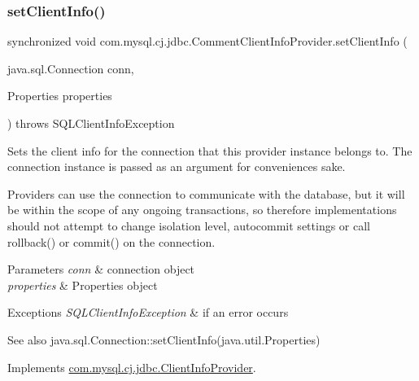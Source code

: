 \subsubsection{\texorpdfstring{set\+Client\+Info()}{setClientInfo()}\hspace{0.1cm}{\footnotesize\ttfamily [1/2]}}
{\footnotesize\ttfamily synchronized void com.\+mysql.\+cj.\+jdbc.\+Comment\+Client\+Info\+Provider.\+set\+Client\+Info (\begin{DoxyParamCaption}\item[{java.\+sql.\+Connection}]{conn,  }\item[{Properties}]{properties }\end{DoxyParamCaption}) throws S\+Q\+L\+Client\+Info\+Exception}

Sets the client info for the connection that this provider instance belongs to. The connection instance is passed as an argument for convenience\textquotesingle{}s sake.

Providers can use the connection to communicate with the database, but it will be within the scope of any ongoing transactions, so therefore implementations should not attempt to change isolation level, autocommit settings or call rollback() or commit() on the connection.


\begin{DoxyParams}{Parameters}
{\em conn} & connection object \\
\hline
{\em properties} & Properties object \\
\hline
\end{DoxyParams}

\begin{DoxyExceptions}{Exceptions}
{\em S\+Q\+L\+Client\+Info\+Exception} & if an error occurs\\
\hline
\end{DoxyExceptions}
\begin{DoxySeeAlso}{See also}
java.\+sql.\+Connection\+::set\+Client\+Info(java.\+util.\+Properties) 
\end{DoxySeeAlso}


Implements \mbox{\hyperlink{interfacecom_1_1mysql_1_1cj_1_1jdbc_1_1_client_info_provider_aa6e19d37534651d9916fb45ea7392044}{com.\+mysql.\+cj.\+jdbc.\+Client\+Info\+Provider}}.

\mbox{\label{classcom_1_1mysql_1_1cj_1_1jdbc_1_1_comment_client_info_provider_a76cfb73296a575e078acf7228e36b2dc}} 
